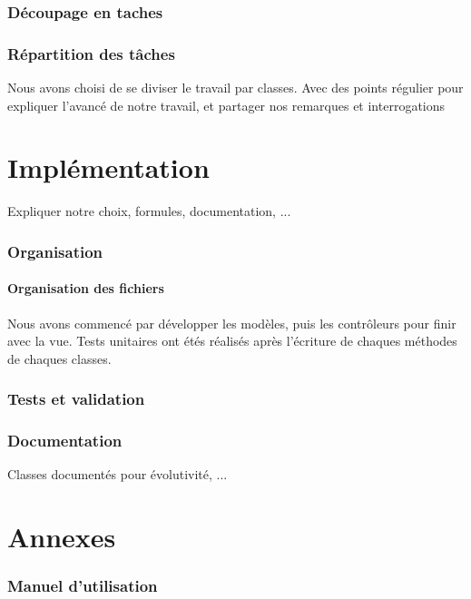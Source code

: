 \documentclass{polytech/polytech}
\begin{document}
	\section{Découpage en taches}
	
	\section{Répartition des tâches}
	
	Nous avons choisi de se diviser le travail par classes.
	Avec des points régulier pour expliquer l'avancé de notre travail, et partager nos remarques et
	interrogations
	
	\part{Implémentation}
	
	Expliquer notre choix, formules, documentation, ...
	
	\section{Organisation}
	
	\subsection{Organisation des fichiers}
	
	Nous avons commencé par développer les modèles, puis les contrôleurs pour finir avec la vue.
	Tests unitaires ont étés réalisés après l'écriture de chaques méthodes de chaques classes.
	
	\section{Tests et validation}
	
	\section{Documentation}
	
	Classes documentés pour évolutivité, ...
	
	\part{Annexes}
	
	\section{Manuel d'utilisation}
	
\end{document}
